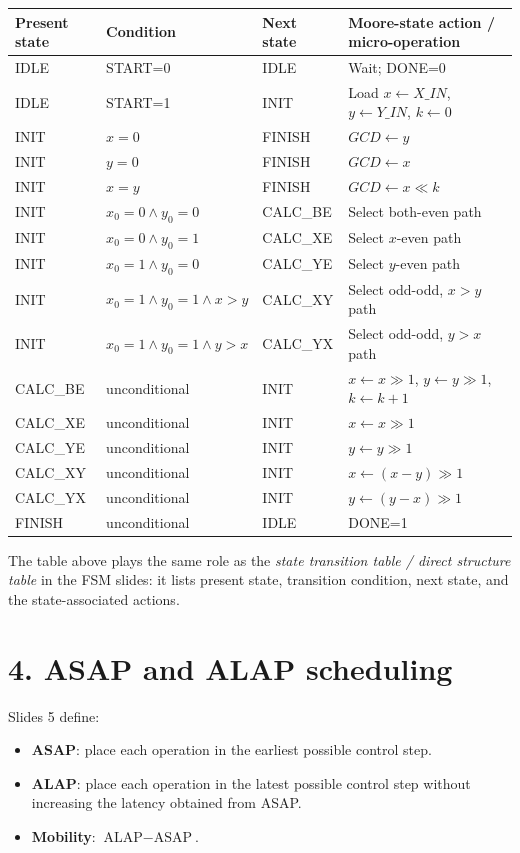 \documentclass[11pt,a4paper]{article}
\begin{document}
\begin{center}
\begin{tabular}{>{\raggedright\arraybackslash}p{1.7cm} >{\raggedright\arraybackslash}p{3.2cm} >{\raggedright\arraybackslash}p{3.0cm} >{\raggedright\arraybackslash}p{5.3cm}}
\toprule
Present state & Condition & Next state & Moore-state action / micro-operation \\
\midrule
IDLE & START=0 & IDLE & Wait; DONE=0 \\
IDLE & START=1 & INIT & Load $x\leftarrow X\_IN$, $y\leftarrow Y\_IN$, $k\leftarrow 0$ \\
INIT & $x=0$ & FINISH & $GCD \leftarrow y$ \\
INIT & $y=0$ & FINISH & $GCD \leftarrow x$ \\
INIT & $x=y$ & FINISH & $GCD \leftarrow x \ll k$ \\
INIT & $x_0=0 \land y_0=0$ & CALC\_BE & Select both-even path \\
INIT & $x_0=0 \land y_0=1$ & CALC\_XE & Select $x$-even path \\
INIT & $x_0=1 \land y_0=0$ & CALC\_YE & Select $y$-even path \\
INIT & $x_0=1 \land y_0=1 \land x>y$ & CALC\_XY & Select odd-odd, $x>y$ path \\
INIT & $x_0=1 \land y_0=1 \land y>x$ & CALC\_YX & Select odd-odd, $y>x$ path \\
CALC\_BE & unconditional & INIT & $x\leftarrow x\gg 1$, $y\leftarrow y\gg 1$, $k\leftarrow k+1$ \\
CALC\_XE & unconditional & INIT & $x\leftarrow x\gg 1$ \\
CALC\_YE & unconditional & INIT & $y\leftarrow y\gg 1$ \\
CALC\_XY & unconditional & INIT & $x\leftarrow (x-y)\gg 1$ \\
CALC\_YX & unconditional & INIT & $y\leftarrow (y-x)\gg 1$ \\
FINISH & unconditional & IDLE & DONE=1 \\
\bottomrule
\end{tabular}
\end{center}

\noindent
The table above plays the same role as the \emph{state transition table / direct structure table} in the FSM slides: it lists present state, transition condition, next state, and the state-associated actions.

\section*{4. ASAP and ALAP scheduling}
Slides 5 define:
\begin{itemize}
  \item \textbf{ASAP}: place each operation in the earliest possible control step.
  \item \textbf{ALAP}: place each operation in the latest possible control step without increasing the latency obtained from ASAP.
  \item \textbf{Mobility}: $\text{ALAP} - \text{ASAP}$.
\end{itemize}
\end{document}
